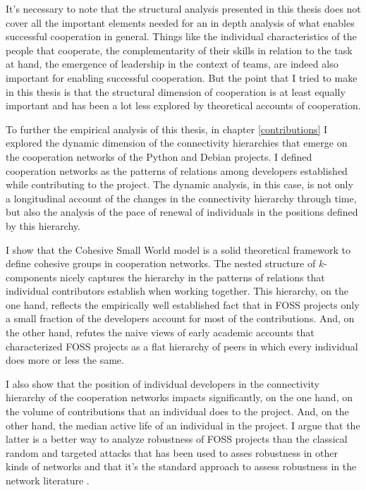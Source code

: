It's necessary to note that the structural analysis presented in this thesis does not cover all the important elements needed for an in depth analysis of what enables successful cooperation in general. Things like the individual characteristics of the people that cooperate, the complementarity of their skills in relation to the task at hand, the emergence of leadership in the context of teams, are indeed also important for enabling successful cooperation. But the point that I tried to make in this thesis is that the structural dimension of cooperation is at least equally important and has been a lot less explored by theoretical accounts of cooperation. 

To further the empirical analysis of this thesis, in chapter \ref{contributions} I explored the dynamic dimension of the connectivity hierarchies that emerge on the cooperation networks of the Python and Debian projects. I defined cooperation networks as the patterns of relations among developers established while contributing to the project. The dynamic analysis, in this case, is not only a longitudinal account of the changes in the connectivity hierarchy through time, but also the analysis of the pace of renewal of individuals in the positions defined by this hierarchy.

I show that the Cohesive Small World model is a solid theoretical framework to define cohesive groups in cooperation networks. The nested structure of $k$-components nicely captures the hierarchy in the patterns of relations that individual contributors establish when working together. This hierarchy, on the one hand, reflects the empirically well established fact that in FOSS projects only a small fraction of the developers account for most of the contributions. And, on the other hand, refutes the naive views of early academic accounts that characterized FOSS projects as a flat hierarchy of peers in which every individual does more or less the same. 

I also show that the position of individual developers in the connectivity hierarchy of the cooperation networks impacts significantly, on the one hand, on the volume of contributions that an individual does to the project. And, on the other hand, the median active life of an individual in the project. I argue that the latter is a better way to analyze robustness of FOSS projects than the classical random and targeted attacks that has been used to asses robustness in other kinds of networks and that it's the standard approach to assess robustness in the network literature \citep{albert:2000}.

